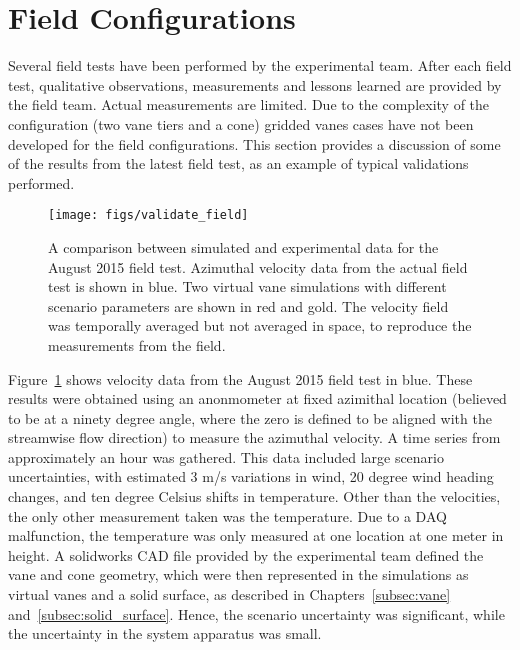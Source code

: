 \section{Field Configurations}
\label{sec:field_val}

Several field tests have been performed by the experimental team. After
each field test, qualitative observations, measurements and lessons
learned are provided by the field team. Actual measurements
are limited. Due to the complexity of the configuration
(two vane tiers and a cone) gridded vanes cases have not been developed 
for the field configurations. This section provides a discussion of some of
the results from the latest field test, as an example of typical
validations performed. 

 \begin{figure}[!htb]
  \begin{center}
   \texttt{[image: figs/validate\_field]}
   \caption{A comparison between simulated and experimental data for the
   August 2015 field test. Azimuthal velocity data from the actual field
   test is shown in blue. Two virtual vane simulations with different
   scenario parameters are shown in red and gold. The velocity field was
   temporally averaged but not averaged in space, to reproduce
   the measurements from the field.}
   \label{fig:field_val}
  \end{center}
 \end{figure}
%
%

Figure~\ref{fig:field_val} shows velocity data from the 
August 2015 field test in blue. These results were 
obtained using an anonmometer at fixed
azimithal location (believed to be at a ninety degree angle, where the zero
is defined to be aligned with the streamwise flow direction) to measure the
azimuthal velocity. A time
series from approximately an hour was gathered. This data included large
scenario uncertainties, with estimated 3 m/s variations in wind, 20
degree wind heading changes, and ten degree Celsius shifts in
temperature. Other than the velocities, the only other measurement
taken was the temperature. Due to a DAQ malfunction, the
temperature was only measured at one location at one meter in height. 
A solidworks CAD file provided by the experimental team
defined the vane and cone geometry, which were then represented in the
simulations as virtual vanes and a solid surface, as described in 
Chapters~\ref{subsec:vane} and~\ref{subsec:solid_surface}. Hence, the
scenario uncertainty was significant, while the uncertainty in the
system apparatus was small. 

